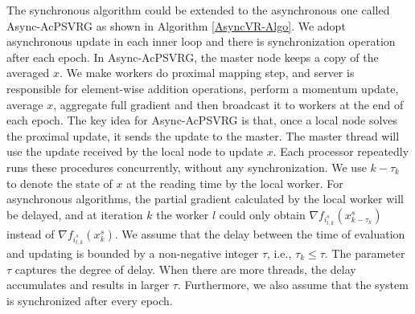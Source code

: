 The  synchronous algorithm could be extended to the asynchronous one called Async-AcPSVRG  as shown in Algorithm \ref{AsyncVR-Algo}. We adopt asynchronous update in each inner loop and there is synchronization operation after each epoch. In Async-AcPSVRG, the  master node keeps a copy of the averaged $x$. We make workers do proximal mapping step, and server is responsible for element-wise addition operations, perform a momentum update, average $x$, aggregate full gradient and then broadcast it to workers at the end of each epoch. 
The key idea for Async-AcPSVRG is that, once a local node solves the proximal update, it  sends  the update to the master. The master thread will use the update received by the local node to update $x$. Each processor repeatedly runs these procedures concurrently, without any synchronization. We use $k-\tau_k$ to denote the state of $x$ at the reading time by the local worker. For asynchronous algorithms, the partial gradient calculated by the local worker will be delayed, and at iteration $k$ the worker $l$ could only obtain $\nabla f_{i_{l,k}^s}(x_{k-\tau_k}^s)$ instead of $\nabla f_{i_{l,k}^s}(x_{k}^s)$. We assume that the delay between the time of evaluation and updating is bounded by a non-negative integer $\tau$, i.e., $\tau_k\leq \tau$. The parameter $\tau$ captures the degree of delay. When there are more threads, the delay accumulates and results in larger $\tau$. Furthermore, we also assume that the system is synchronized after every epoch.

